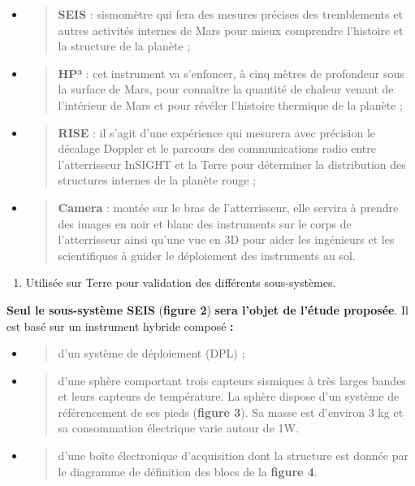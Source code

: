 \documentclass[]{article}
\begin{document}
\begin{itemize}
\item
  \begin{quote}
  \textbf{SEIS} : sismomètre qui fera des mesures précises des
  tremblements et autres activités internes de Mars pour mieux
  comprendre l'histoire et la structure de la planète ;
  \end{quote}
\item
  \begin{quote}
  \textbf{HP³} : cet instrument va s'enfoncer, à cinq mètres de
  profondeur sous la surface de Mars, pour connaître la quantité de
  chaleur venant de l'intérieur de Mars et pour révéler l'histoire
  thermique de la planète ;
  \end{quote}
\item
  \begin{quote}
  \textbf{RISE} : il s'agit d'une expérience qui mesurera avec précision
  le décalage Doppler et le parcours des communications radio entre
  l'atterrisseur InSIGHT et la Terre pour déterminer la distribution des
  structures internes de la planète rouge ;
  \end{quote}
\item
  \begin{quote}
  \textbf{Camera} : montée sur le bras de l'atterrisseur, elle servira à
  prendre des images en noir et blanc des instruments sur le corps de
  l'atterrisseur ainsi qu'une vue en 3D pour aider les ingénieurs et les
  scientifiques à guider le déploiement des instruments au sol.
  \end{quote}
\end{itemize}

\begin{enumerate}
\def\labelenumi{\arabic{enumi}.}
\item
  Utilisée sur Terre pour validation des différents sous-systèmes.
\end{enumerate}

\protect\hypertarget{page3}{}{}\textbf{Seul le sous-système SEIS}
(\textbf{figure 2}) \textbf{sera l'objet de l'étude proposée}. Il est
basé sur un instrument hybride composé \textbf{:}

\begin{itemize}
\item
  \begin{quote}
  d'un système de déploiement (DPL) ;
  \end{quote}
\item
  \begin{quote}
  d'une sphère comportant trois capteurs sismiques à très larges bandes
  et leurs capteurs de température. La sphère dispose d'un système de
  référencement de ses pieds (\textbf{figure 3}). Sa masse est d'environ
  3 kg et sa consommation électrique varie autour de 1W.
  \end{quote}
\item
  \begin{quote}
  d'une boîte électronique d'acquisition dont la structure est donnée
  par le diagramme de définition des blocs de la \textbf{figure 4}.
  \end{quote}
\end{itemize}
\end{document}
